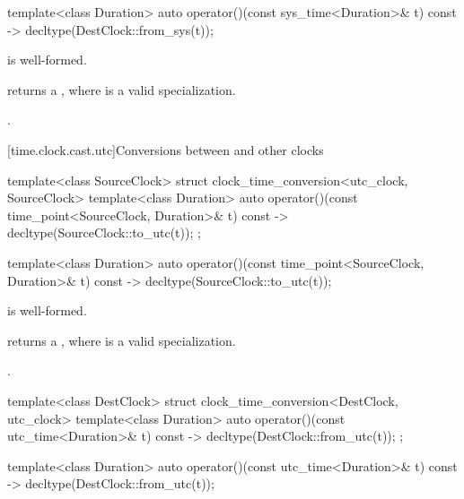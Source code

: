 %
\begin{itemdecl}
template<class Duration>
  auto operator()(const sys_time<Duration>& t) const
    -> decltype(DestClock::from_sys(t));
\end{itemdecl}

\begin{itemdescr}
\pnum
\constraints
{} is well-formed.

\pnum
\mandates
{} returns a ,
where  is a valid  specialization.

\pnum
\returns
{}.
\end{itemdescr}

[time.clock.cast.utc]{Conversions between  and other clocks}

\begin{codeblock}
template<class SourceClock>
struct clock_time_conversion<utc_clock, SourceClock> {
  template<class Duration>
    auto operator()(const time_point<SourceClock, Duration>& t) const
      -> decltype(SourceClock::to_utc(t));
};
\end{codeblock}

%
\begin{itemdecl}
template<class Duration>
  auto operator()(const time_point<SourceClock, Duration>& t) const
    -> decltype(SourceClock::to_utc(t));
\end{itemdecl}

\begin{itemdescr}
\pnum
\constraints
{} is well-formed.

\pnum
\mandates
{}  returns a ,
where  is a valid  specialization.

\pnum
\returns
{}.
\end{itemdescr}

\begin{codeblock}
template<class DestClock>
struct clock_time_conversion<DestClock, utc_clock> {
  template<class Duration>
    auto operator()(const utc_time<Duration>& t) const
      -> decltype(DestClock::from_utc(t));
};
\end{codeblock}

%
\begin{itemdecl}
template<class Duration>
  auto operator()(const utc_time<Duration>& t) const
    -> decltype(DestClock::from_utc(t));
\end{itemdecl}

